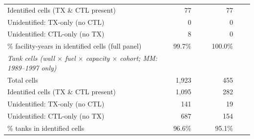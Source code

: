 \begin{table}
\begin{tabular}[t]{lr>{}r>{}rr>{}r>{}r}
    \hspace{1em}\quad Identified cells (TX \& CTL present) & 77 & \textcolor{lightgray}{} & \textcolor{lightgray}{} & 77 & \textcolor{lightgray}{} & \textcolor{lightgray}{}\\
    \hspace{1em}\quad Unidentified: TX-only (no CTL) & 0 & \textcolor{lightgray}{} & \textcolor{lightgray}{} & 0 & \textcolor{lightgray}{} & \textcolor{lightgray}{}\\
    \hspace{1em}\quad Unidentified: CTL-only (no TX) & 8 & \textcolor{lightgray}{} & \textcolor{lightgray}{} & 0 & \textcolor{lightgray}{} & \textcolor{lightgray}{}\\
    \hspace{1em}\quad \% facility-years in identified cells (full panel) & 99.7\% & \textcolor{lightgray}{} & \textcolor{lightgray}{} & 100.0\% & \textcolor{lightgray}{} & \textcolor{lightgray}{}\\
    \textcolor{gray!60}{\emph{\hspace{1em}\textit{Tank cells} (wall $\times$ fuel $\times$ capacity $\times$ cohort; MM: 1989--1997 only)}} & \textcolor{gray!60}{\emph{}} & \textcolor{lightgray}{\textcolor{gray!60}{\emph{}}} & \textcolor{lightgray}{\textcolor{gray!60}{\emph{}}} & \textcolor{gray!60}{\emph{}} & \textcolor{lightgray}{\textcolor{gray!60}{\emph{}}} & \textcolor{lightgray}{\textcolor{gray!60}{\emph{}}}\\
    \hspace{1em}\quad Total cells & 1,923 & \textcolor{lightgray}{} & \textcolor{lightgray}{} & 455 & \textcolor{lightgray}{} & \textcolor{lightgray}{}\\
    \hspace{1em}\quad Identified cells (TX \& CTL present) & 1,095 & \textcolor{lightgray}{} & \textcolor{lightgray}{} & 282 & \textcolor{lightgray}{} & \textcolor{lightgray}{}\\
    \hspace{1em}\quad Unidentified: TX-only (no CTL) & 141 & \textcolor{lightgray}{} & \textcolor{lightgray}{} & 19 & \textcolor{lightgray}{} & \textcolor{lightgray}{}\\
    \hspace{1em}\quad Unidentified: CTL-only (no TX) & 687 & \textcolor{lightgray}{} & \textcolor{lightgray}{} & 154 & \textcolor{lightgray}{} & \textcolor{lightgray}{}\\
    \hspace{1em}\quad \% tanks in identified cells & 96.6\% & \textcolor{lightgray}{} & \textcolor{lightgray}{} & 95.1\% & \textcolor{lightgray}{} & \textcolor{lightgray}{}\\
    \bottomrule
    \end{tabular}
    \endgroup{}
    \end{table}